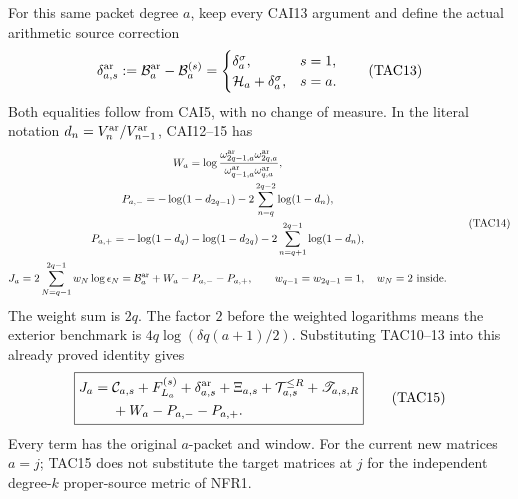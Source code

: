 For this same packet degree $a$, keep every CAI13 argument and define
the actual arithmetic source correction
\[
 \delta_{a,s}^{\rm ar}:=\mathcal B_a^{\rm ar}-\mathcal B_a^{(s)}
 =\begin{cases}
     \delta_a^\sigma,&s=1,\\
     \mathcal H_a+\delta_a^\sigma,&s=a.
   \end{cases}
 \tag{TAC13}
\]
Both equalities follow from CAI5, with no change of measure.
In the literal notation $d_n=V_n^{\rm ar}/V_{n-1}^{\rm ar}$,
CAI12--15 has
\[
 \begin{gathered}
 W_a=\log\frac{\omega_{2q-1,a}^{\rm ar}\omega_{2q,a}^{\rm ar}}
                      {\omega_{q-1,a}^{\rm ar}\omega_{q,a}^{\rm ar}},\\
 P_{a,-}=-\log(1-d_{2q-1})-2\sum_{n=q}^{2q-2}\log(1-d_n),\\
 P_{a,+}=-\log(1-d_q)-\log(1-d_{2q})
                          -2\sum_{n=q+1}^{2q-1}\log(1-d_n),\\
 J_a=2\sum_{N=q-1}^{2q-1}w_N\log\epsilon_N
      =\mathcal B_a^{\rm ar}+W_a-P_{a,-}-P_{a,+},\qquad
 w_{q-1}=w_{2q-1}=1,\quad w_N=2\text{ inside}.
 \end{gathered}
 \tag{TAC14}
\]
The weight sum is $2q$.  The factor $2$ before the weighted logarithms
means the exterior benchmark is $4q\log(\delta q(a+1)/2)$.
Substituting TAC10--13 into this already proved identity gives
\[
 \boxed{\begin{split}
 J_a={}&\mathcal C_{a,s}+F_{L_a}^{(s)}
       +\delta_{a,s}^{\rm ar}+\Xi_{a,s}
       +\mathcal T_{a,s}^{\le R}+\mathscr T_{a,s,R}\\
       &+W_a-P_{a,-}-P_{a,+}.
 \end{split}}
 \tag{TAC15}
\]
Every term has the original $a$-packet and window.  For the current
new matrices $a=j$; TAC15 does not substitute the target matrices at
$j$ for the independent degree-$k$ proper-source metric of NFR1.

